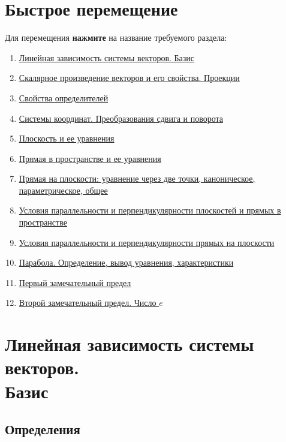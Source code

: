 \documentclass[12pt, fleqn]{extarticle}
\begin{document}
\section*{Быстрое перемещение}

Для перемещения \textbf{нажмите} на название требуемого раздела:
\begin{enumerate}[noitemsep]
    \item \hyperref[sec:linear-dependence]{Линейная зависимость системы векторов. Базис}
    \item \hyperref[sec:scalar-multiply]{Скалярное произведение векторов и его свойства. Проекции}
    \item \hyperref[sec:det]{Свойства определителей}
    \item \hyperref[sec:coordinate_systems]{Системы координат. Преобразования сдвига и поворота}
    \item \hyperref[sec:plane]{Плоскость и ее уравнения}
    \item \hyperref[sec:line_in_space]{Прямая в пространстве и ее уравнения}
    \item \hyperref[sec:line_on_plane]{Прямая на плоскости: уравнение через две точки, каноническое, параметрическое, общее}
    \item \hyperref[sec:parallel_perpendicular_planes]{Условия параллельности и перпендикулярности плоскостей и прямых в пространстве}
    \item \hyperref[sec:parallel_perpendicular_lines]{Условия параллельности и перпендикулярности прямых на плоскости}
    \item \hyperref[sec:parabola]{Парабола. Определение, вывод уравнения, характеристики}
    \item \hyperref[sec:limit_1]{Первый замечательный предел}
    \item \hyperref[sec:limit_2]{Второй замечательный предел. Число \(e\)}
\end{enumerate}

\newpage

\section{Линейная зависимость системы векторов. \\ Базис}\label{sec:linear-dependence}

\subsection*{Определения}
\end{document}
